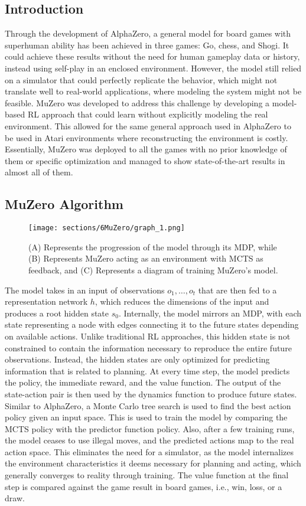 \subsection{Introduction}
Through the development of AlphaZero, a general model for board games with
superhuman ability has been achieved in three games: Go, chess, and Shogi. It
could achieve these results without the need for human gameplay data or
history, instead using self-play in an enclosed environment. However, the model
still relied on a simulator that could perfectly replicate the behavior, which
might not translate well to real-world applications, where modeling the system
might not be feasible. MuZero was developed to address this challenge by
developing a model-based RL approach that could learn without explicitly
modeling the real environment. This allowed for the same general approach used
in AlphaZero to be used in Atari environments where reconstructing the
environment is costly. Essentially, MuZero was deployed to all the games with
no prior knowledge of them or specific optimization and managed to show
state-of-the-art results in almost all of them.

\subsection{MuZero Algorithm}
\begin{figure*}[t]
    \centering
    \texttt{[image: sections/6MuZero/graph\_1.png]}
    \caption{(A) Represents the progression of the model through its MDP, while (B) Represents MuZero acting as an environment with MCTS as feedback, and (C) Represents a diagram of training MuZero's model.}
\end{figure*}
The model takes in an input of observations $o_1, \ldots, o_t$ that are then fed to a representation network $h$,
which reduces the dimensions of the input and produces a root hidden state $s_0$. Internally, the model
mirrors an MDP, with each state representing a node with edges connecting it to the future states
depending on available actions. Unlike traditional RL approaches, this hidden state is not constrained to
contain the information necessary to reproduce the entire future observations. Instead, the hidden states
are only optimized for predicting information that is related to planning. At every time step, the model
predicts the policy, the immediate reward, and the value function. The output of the state-action pair is
then used by the dynamics function to produce future states. Similar to AlphaZero, a Monte Carlo tree
search is used to find the best action policy given an input space. This is used to train the model by
comparing the MCTS policy with the predictor function policy. Also, after a few training runs, the model
ceases to use illegal moves, and the predicted actions map to the real action space. This eliminates the
need for a simulator, as the model internalizes the environment characteristics it deems necessary for
planning and acting, which generally converges to reality through training. The value function at
the final step is compared against the game result in board games, i.e., win, loss, or a draw.

